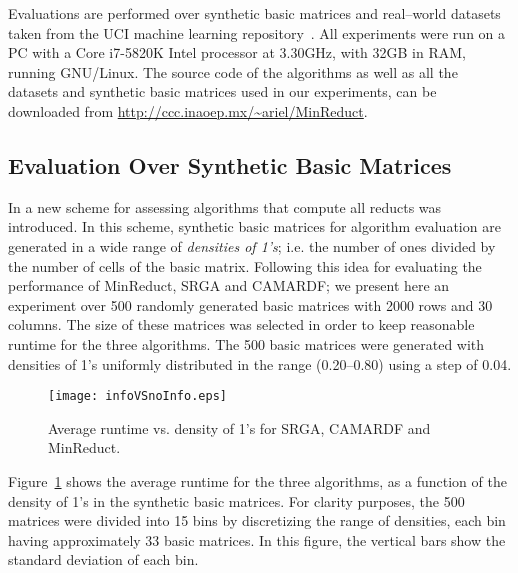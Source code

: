 \documentclass[authoryear,preprint,review,12pt]{elsarticle}
\begin{document}
	Evaluations are performed over synthetic basic matrices and real--world datasets taken from the UCI machine learning repository~\citep{Bache13}. All experiments were run on a PC with a Core i7-5820K Intel processor at 3.30GHz, with 32GB in RAM, running GNU/Linux. The source code of the algorithms as well as all the datasets and synthetic basic matrices used in our experiments, can be downloaded from \url{http://ccc.inaoep.mx/~ariel/MinReduct}.
	
\subsection{Evaluation Over Synthetic Basic Matrices}\label{sub:synth}

	In \citep{Rodriguez2017} a new scheme for assessing algorithms that compute all reducts was introduced. In this scheme, synthetic basic matrices for algorithm evaluation are generated in a wide range of \emph{densities of 1's}; i.e. the number of ones divided by the number of cells of the basic matrix. Following this idea for evaluating the performance of MinReduct, SRGA and CAMARDF; we present here an experiment over 500 randomly generated basic matrices with 2000 rows and 30 columns. The size of these matrices was selected in order to keep reasonable runtime for the three algorithms. The 500 basic matrices were generated with densities of 1's uniformly distributed in the range (0.20--0.80) using a step of 0.04. 
				
	\begin{figure}[hbt]
		\begin{center}
			\texttt{[image: infoVSnoInfo.eps]}
		\end{center}
		\caption{Average runtime vs. density of 1's for SRGA, CAMARDF and MinReduct.}
		\label{fig:synthetic}
	\end{figure}  

	Figure~\ref{fig:synthetic} shows the average runtime for the three algorithms, as a function of the density of 1's in the synthetic basic matrices. For clarity purposes, the 500 matrices were divided into 15 bins by discretizing the range of densities, each bin having approximately 33 basic matrices. In this figure, the vertical bars show the standard deviation of each bin.
		
\end{document}
